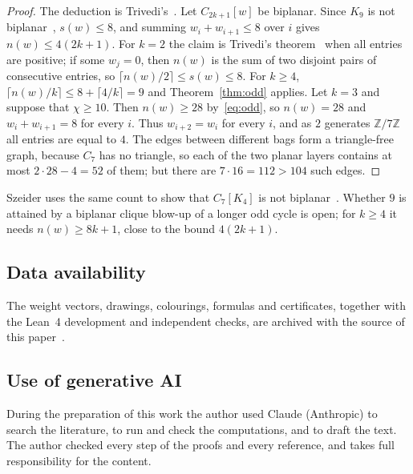 \documentclass[11pt]{amsart}
\theoremstyle{definition}
\theoremstyle{remark}
\numberwithin{equation}{section}
\newcommand{\Z}{\mathbb{Z}}
\begin{document}
\begin{proof}
The deduction is Trivedi's~\cite[Question~7.1]{Tr}. Let $C_{2k+1}[w]$ be biplanar. Since $K_9$ is not biplanar~\cite{BHK,Tu}, $s(w)\le8$, and summing $w_i+w_{i+1}\le8$ over $i$ gives $n(w)\le4(2k+1)$. For $k=2$ the claim is Trivedi's theorem~\cite{Tr} when all entries are positive; if some $w_j=0$, then $n(w)$ is the sum of two disjoint pairs of consecutive entries, so $\lceil n(w)/2\rceil\le s(w)\le8$. For $k\ge4$, $\lceil n(w)/k\rceil\le8+\lceil4/k\rceil=9$ and Theorem~\ref{thm:odd} applies. Let $k=3$ and suppose that $\chi\ge10$. Then $n(w)\ge28$ by~\eqref{eq:odd}, so $n(w)=28$ and $w_i+w_{i+1}=8$ for every $i$. Thus $w_{i+2}=w_i$ for every $i$, and as $2$ generates $\Z/7\Z$ all entries are equal to $4$. The edges between different bags form a triangle-free graph, because $C_7$ has no triangle, so each of the two planar layers contains at most $2\cdot28-4=52$ of them; but there are $7\cdot16=112>104$ such edges.
\end{proof}

Szeider uses the same count to show that $C_7[K_4]$ is not biplanar~\cite[Section~7]{Sz}. Whether $9$ is attained by a biplanar clique blow-up of a longer odd cycle is open; for $k\ge4$ it needs $n(w)\ge8k+1$, close to the bound $4(2k+1)$.

\subsection*{Data availability}
The weight vectors, drawings, colourings, formulas and certificates, together with the Lean~4 development and independent checks, are archived with the source of this paper~\cite{Ar}.

\subsection*{Use of generative AI}
During the preparation of this work the author used Claude (Anthropic) to search the literature, to run and check the computations, and to draft the text. The author checked every step of the proofs and every reference, and takes full responsibility for the content.
\end{document}
